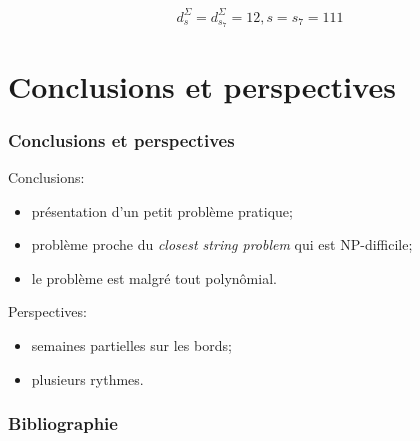 \documentclass[table]{beamer}
\newcommand{\+}{\cellcolor[gray]{1}\bfseries}
\newcommand{\<}{\cellcolor[gray]{0.8}\rmfamily\itshape}
\newcommand*{\foreign}[2][english]{%
    \emph{\foreignlanguage{#1}{#2}}%
}
\begin{document}
\begin{frame}
  \begin{displaymath}
    d^\Sigma_s = d^\Sigma_{s_7} = 12, s = s_7 = 111
  \end{displaymath}
\end{frame}

\section{Conclusions et perspectives}

\begin{frame}
  \frametitle{Conclusions et perspectives}

  Conclusions:
  \begin{itemize}
  \item présentation d'un petit problème pratique;
  \item problème proche du \foreign{closest string problem} qui est
    NP-difficile;
  \item le problème est malgré tout polynômial.
  \end{itemize}\pause

  Perspectives:
  \begin{itemize}
  \item semaines partielles sur les bords;
  \item plusieurs rythmes.
  \end{itemize}
\end{frame}

\begin{frame}
  \titlepage
\end{frame}

\appendix

\begin{frame}[allowframebreaks]
  \frametitle{Bibliographie}
  
  
\end{frame}
\end{document}
